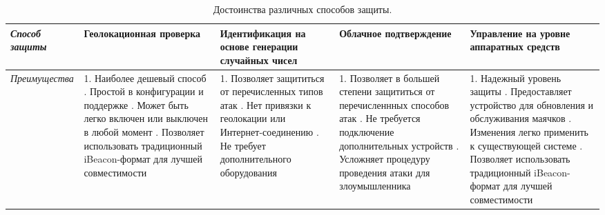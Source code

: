 \begin{sidewaystable}
    \caption[Caption]{Достоинства различных способов защиты.}
	\begin{tabu} to 
	\hline
	\textit{Способ защиты} & 
	    \textbf{Геолокационная проверка} & 
	    \textbf{Идентификация на основе генерации случайных чисел} &
	    \textbf{Облачное подтверждение} &
	    \textbf{Управление на уровне аппаратных средств} \\
	\hline
	
	\textit{Преимущества} & 
	    1. Наиболее дешевый способ . Простой в конфигурации и поддержке . Может быть легко включен или выключен в любой момент . Позволяет использовать традиционный iBeacon-формат для лучшей совместимости & 
	    
	    1. Позволяет защититься от перечисленных типов атак . Нет привязки к геолокации или Интернет-соединению . Не требует дополнительного оборудования &
	    
	    1. Позволяет в большей степени защититься от перечисленнных способов атак . Не требуется подключение дополнительных устройств . Усложняет процедуру проведения атаки для злоумышленника &
	    
	    1. Надежный уровень защиты . Предоставляет устройство для обновления и обслуживания маячков . Изменения легко применить к существующей системе . Позволяет использовать традиционный iBeacon-формат для лучшей совместимости \\
	\hline
	\end{tabu}
\end{sidewaystable}

